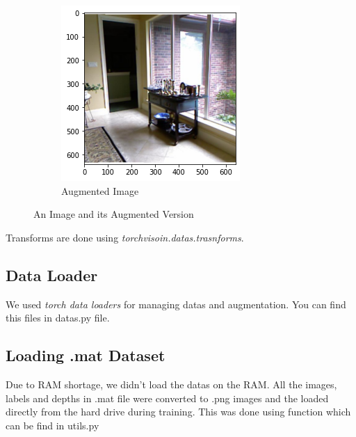 \documentclass[a4paper, openany]{book}
\begin{document}
\begin{figure}[ht]
\begin{subfigure}[b]{0.3\linewidth}
    \includegraphics[width=\linewidth]{images/aug_image.png}
    \caption{Augmented Image}
  \end{subfigure}
  \caption{An Image and its Augmented Version}
  \label{fig:augment}
\end{figure}

Transforms are done using \textit{torchvisoin.datas.trasnforms}.
\subsection{Data Loader}
	\vspace{0.3cm}
We used \textit{torch data loaders} for managing datas and augmentation. You can find this files in datas.py file.

\subsection{Loading .mat Dataset}
	\vspace{0.3cm}

Due to RAM shortage, we didn't load the datas on the RAM. All the images, labels and depths in .mat file were converted to .png images and the loaded directly from the hard drive during training. This was done using function  which can be find in utils.py


\newpage
\end{document}
